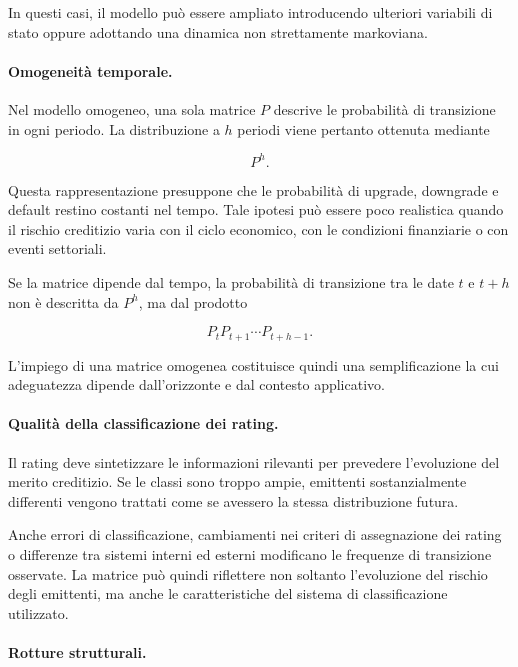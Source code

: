 In questi casi, il modello pu\`{o} essere ampliato introducendo ulteriori
variabili di stato oppure adottando una dinamica non strettamente
markoviana.

\paragraph{Omogeneit\`{a} temporale.}

Nel modello omogeneo, una sola matrice $P$ descrive le probabilit\`{a}
di transizione in ogni periodo. La distribuzione a $h$ periodi viene
pertanto ottenuta mediante

\[
P^h.
\]

Questa rappresentazione presuppone che le probabilit\`{a} di upgrade,
downgrade e default restino costanti nel tempo. Tale ipotesi pu\`{o}
essere poco realistica quando il rischio creditizio varia con il ciclo
economico, con le condizioni finanziarie o con eventi settoriali.

Se la matrice dipende dal tempo, la probabilit\`{a} di transizione tra
le date $t$ e $t+h$ non \`{e} descritta da $P^h$, ma dal prodotto

\[
P_t P_{t+1}\cdots P_{t+h-1}.
\]

L'impiego di una matrice omogenea costituisce quindi una
semplificazione la cui adeguatezza dipende dall'orizzonte e dal
contesto applicativo.

\paragraph{Qualit\`{a} della classificazione dei rating.}

Il rating deve sintetizzare le informazioni rilevanti per prevedere
l'evoluzione del merito creditizio. Se le classi sono troppo ampie,
emittenti sostanzialmente differenti vengono trattati come se avessero
la stessa distribuzione futura.

Anche errori di classificazione, cambiamenti nei criteri di assegnazione
dei rating o differenze tra sistemi interni ed esterni modificano le
frequenze di transizione osservate. La matrice pu\`{o} quindi riflettere
non soltanto l'evoluzione del rischio degli emittenti, ma anche le
caratteristiche del sistema di classificazione utilizzato.

\paragraph{Rotture strutturali.}

